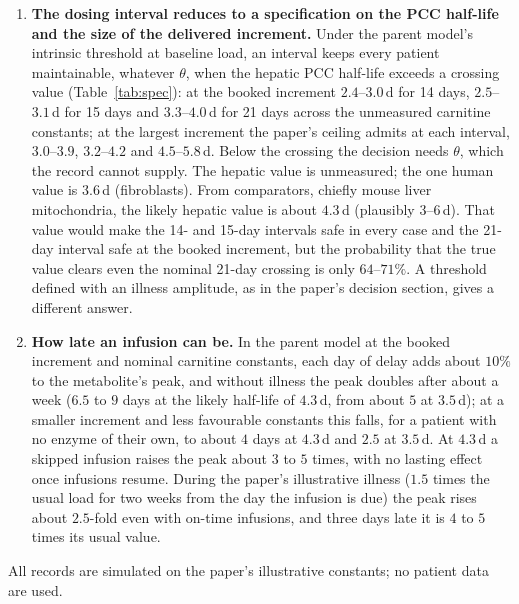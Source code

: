 \documentclass[11pt,a4paper]{article}
\begin{document}
{{\begin{enumerate}[leftmargin=1.5em,topsep=3pt]
windows.
\item \textbf{The dosing interval reduces to a specification on the PCC half-life and the
size of the delivered increment.} Under the parent model's intrinsic threshold at baseline
load, an interval keeps every patient maintainable, whatever $\theta$, when the hepatic PCC
half-life exceeds a crossing value (Table~\ref{tab:spec}): at the booked increment
$2.4$--$3.0$\,d for 14 days, $2.5$--$3.1$\,d for 15 days and $3.3$--$4.0$\,d for 21 days
across the unmeasured carnitine constants; at the largest increment the paper's ceiling
admits at each interval, $3.0$--$3.9$, $3.2$--$4.2$ and $4.5$--$5.8$\,d. Below the crossing the decision
needs $\theta$, which the record cannot supply. The hepatic value is unmeasured; the one human
value is $3.6$\,d (fibroblasts). From comparators, chiefly mouse liver mitochondria, the likely
hepatic value is about $4.3$\,d (plausibly $3$--$6$\,d). That value would make the 14- and
15-day intervals safe in every case and the 21-day interval safe at the booked increment, but
the probability that the true value clears even the nominal 21-day crossing is only
$64$--$71\%$. A threshold defined with an illness amplitude, as in the paper's decision section,
gives a different answer.
\item \textbf{How late an infusion can be.} In the parent model at the booked increment and
nominal carnitine constants, each day of delay adds about $10\%$ to the metabolite's peak, and
without illness the peak doubles after about a week ($6.5$ to $9$ days at the likely half-life of
$4.3$\,d, from about $5$ at $3.5$\,d); at a smaller increment and less favourable constants this
falls, for a patient with no enzyme of their own, to about $4$ days at $4.3$\,d and $2.5$ at
$3.5$\,d. At $4.3$\,d a skipped infusion raises the
peak about $3$ to $5$ times, with no lasting effect once infusions resume. During the paper's
illustrative illness ($1.5$ times the usual load for two weeks from the day the infusion is due)
the peak rises about $2.5$-fold even with on-time infusions, and three days late it is $4$ to $5$
times its usual value.
\end{enumerate}
\vspace{-2pt}
All records are simulated on the paper's illustrative constants; no patient data are used.
}}
\end{document}
